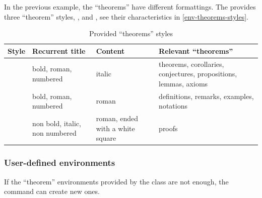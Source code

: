 \documentclass[english,nolocaltoc]{nwejmart}
\newtheorem[style=definition]{fact}
\newtheorem[title-plural=Criteria]{criterion}
\newtheorem[title=random experiment]{rexp}
\begin{document}
In the previous example, the \enquote{theorems} have different
formattings. The \nwejmauthorcl{} provides three \enquote{theorem}
styles, ,  and
, see their characteristics in 
\vref{env-theorems-styles}.

\begin{table}
  \centering
  \begin{tabulary}{\linewidth}{lLLL}
    Style                 & Recurrent title                  & Content
    & Relevant \enquote{theorems}               \\\toprule
        & bold, roman, numbered           & italic
                                                                                                  & theorems, corollaries, conjectures, propositions, lemmas, axioms \\\midrule
     & bold, roman, numbered            & roman                             & definitions, remarks, examples, notations \\\midrule
          & non bold, italic, non numbered & roman,
                                                             ended
                                                             with a
                                                             white square & proofs                                     \\\bottomrule
  \end{tabulary}
  \caption{Provided \enquote{theorems} styles}
  \label{env-theorems-styles}
\end{table}

\subsubsection{User-defined environments}
\label{sec:envir-de-type-1}

If the \enquote{theorem} environments provided by the  class are not
enough, the  command can create new ones.
\end{document}
